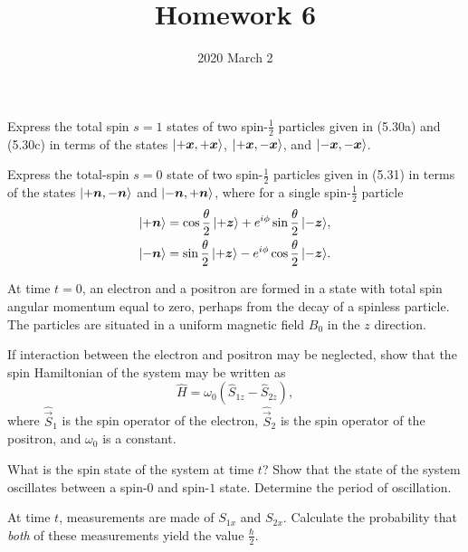\documentclass{../phys116}
\title{Homework 6}
\author{}
\date{2020 March 2}
\newcommand{\kv}[2]{\ket{#1 \vec{#2}}}
\newcommand{\kvv}[3]{\ket{#2 \vec{#1}, #3 \vec{#1}}}
\newcommand{\xx}{\kvv x}
\newcommand{\nn}{\kvv n}
\begin{document}
\begin{exercise}
  Express the total spin \(s=1\) states of two spin-\(\frac 1 2\)
  particles given in (5.30a) and (5.30c) in terms of the states
  \(\xx ++\), \(\xx +-\), and \(\xx --\).
\end{exercise}

\begin{solution}
\end{solution}

\begin{exercise}
  Express the total-spin \(s=0\) state of two spin-\(\frac 1 2\)
  particles given in (5.31) in terms of the states \(\nn +-\) and
  \(\nn -+\), where for a single spin-\(\frac 1 2\) particle
  \begin{align*}
    \kv +n
    &= \cos \frac \theta 2 \, \ket{+\vec z}
    + e^{i\phi} \sin \frac \theta 2 \, \ket{-\vec z}, \\
    \kv -n
    &= \sin \frac \theta 2 \, \ket{+\vec z}
    - e^{i\phi} \cos \frac \theta 2 \, \ket{-\vec z}.
  \end{align*}
\end{exercise}

\begin{solution}
\end{solution}

\begin{exercise}
  At time \(t=0\), an electron and a positron are formed in a state
  with total spin angular momentum equal to zero, perhaps from the
  decay of a spinless particle.  The particles are situated in a
  uniform magnetic field \(B_0\) in the \(z\) direction.
  \begin{problems}
  \item If interaction between the electron and positron may be
    neglected, show that the spin Hamiltonian of the system may be
    written as
    \[
      \hat H = \omega_0 (\hat S_{1z} - \hat S_{2z}),
    \]
    where \(\hat{\vec S}_1\) is the spin operator of the electron,
    \(\hat{\vec S}_2\) is the spin operator of the positron, and
    \(\omega_0\) is a constant.
  \item What is the spin state of the system at time \(t\)?  Show that
    the state of the system oscillates between a spin-\(0\) and
    spin-\(1\) state.  Determine the period of oscillation.
  \item At time \(t\), measurements are made of \(S_{1x}\) and
    \(S_{2x}\).  Calculate the probability that \emph{both} of these
    measurements yield the value \(\frac \hbar 2\).
  \end{problems}
\end{exercise}
\end{document}

